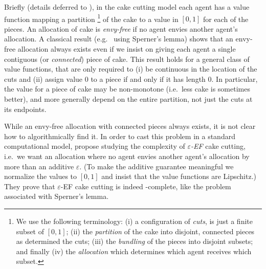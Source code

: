 \documentclass[letterpaper,11pt]{article}
\begin{document}
Briefly (details deferred to ), in the cake cutting  model each agent has a value function mapping a partition%
\footnote{We use the following terminology: (i) a configuration of {\em cuts}, is just a finite subset of $[0,1]$; (ii) the {\em partition} of the cake into disjoint, connected pieces as determined the cuts; (iii) the {\em bundling} of the pieces into disjoint subsets; and finally (iv) the {\em allocation} which determines which agent receives which subset.} of the cake to a value in $[0,1]$ for each of the pieces. An allocation of cake is {\em envy-free} if no agent envies another agent's allocation. A classical result (e.g.~\cite{Su99-rental-harmony} using Sperner's lemma) shows that an envy-free allocation always exists even if we insist on giving each agent a single contiguous (or {\em connected}) piece of cake.
This result holds for a general class of value functions, that are only required to (i) be continuous in the location of the cuts and (ii) assign value $0$ to a piece if and only if it has length $0$. In particular, the value for a piece of cake may be non-monotone (i.e.~less cake is sometimes better), and more generally depend on the entire partition, not just the cuts at its endpoints. 

While an envy-free allocation with connected pieces always exists, it is not clear how to algorithmically find it. In order to cast this problem in a standard computational model, \cite{DBLP:journals/ior/DengQS12} propose studying the complexity of {\em $\varepsilon$-EF} cake cutting, i.e.~we want an allocation where no agent envies another agent's allocation by more than an additive $\varepsilon$. (To make the additive guarantee meaningful we normalize the values to $[0,1]$ and insist that the value functions are Lipschitz.)
They prove that $\varepsilon$-EF cake cutting is indeed \PPAD-complete, like the problem associated with Sperner's lemma.
\end{document}
